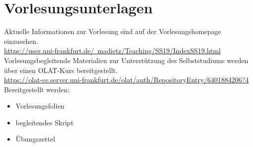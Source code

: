 \section{Vorlesungsunterlagen}
Aktuelle Informationen zur Vorlesung sind auf der Vorlesungshomepage einzusehen.\\
\noindent
\href{https://user.uni-frankfurt.de/~madietz/Teaching/SS19/IndexSS19.html}{https://user.uni-frankfurt.de/~madietz/Teaching/SS19/IndexSS19.html}\\
\noindent
Vorlesungsbegleitende Materialien zur Unterstützung des Selbststudiums werden über einen OLAT-Kurs bereitgestellt.\\
\noindent
\href{https://olat-ce.server.uni-frankfurt.de/olat/auth/RepositoryEntry/6401884206?4}{https://olat-ce.server.uni-frankfurt.de/olat/auth/RepositoryEntry/6401884206?4}\\
\noindent
Bereitgestellt werden:
\begin{itemize}
\item Vorlesungsfolien
\item begleitendes Skript
\item Übungszettel
\end{itemize}
